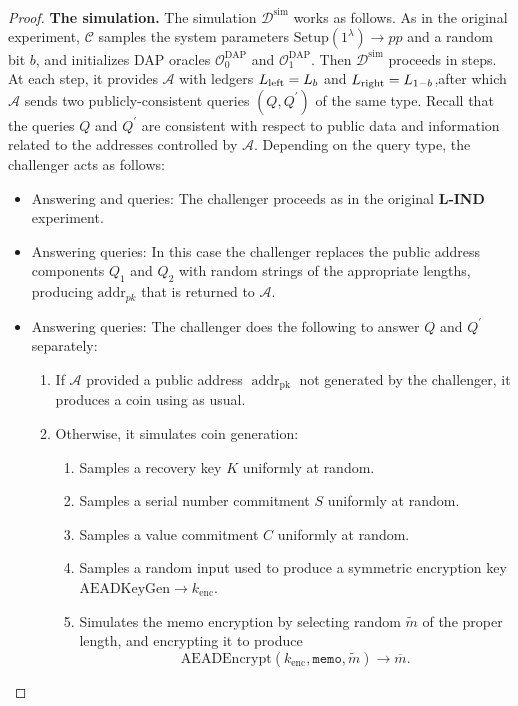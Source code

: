 \documentclass{llncs}
\newcommand{\addr}{\operatorname{addr}}
\begin{document}
\begin{proof}
\textbf{The simulation.} The simulation $\mathcal{D}^{\text{sim}}$ works as follows.
As in the original experiment, $\mathcal{C}$ samples the system parameters $\text{Setup}(1^\lambda) \to pp$ and a random bit $b$, and initializes DAP oracles $\mathcal{O}^{\text{DAP}}_0$ and $\mathcal{O}^{\text{DAP}}_1$.
Then $\mathcal{D}^{\text{sim}}$ proceeds in steps.
At each step, it provides $\mathcal{A}$ with ledgers $L_{\text{\text{left}}} = L_{b}$ and $L_{\text{\text{right}}} = L_{1-b}$,after which $\mathcal{A}$ sends two publicly-consistent queries $(Q, Q^\prime)$ of the same type.
Recall that the queries $Q$ and $Q^\prime$ are consistent with respect to public data and information related to the addresses controlled by $\mathcal{A}$.
Depending on the query type, the challenger acts as follows:
\begin{itemize}
    \item Answering  and  queries: The challenger proceeds as in the original \textbf{L-IND} experiment.
    \item Answering  queries: In this case the challenger replaces the public address components $Q_1$ and $Q_2$ with random strings of the appropriate lengths, producing $\text{addr}_{pk}$ that is returned to $\mathcal{A}$.
    \item Answering  queries: The challenger does the following to answer $Q$ and $Q^\prime$ separately:
    \begin{enumerate}
        \item If $\mathcal{A}$ provided a public address $\addr_{\text{pk}}$ not generated by the challenger, it produces a coin using  as usual.
        \item Otherwise, it simulates coin generation:
        \begin{enumerate}
            \item Samples a recovery key $K$ uniformly at random.
            \item Samples a serial number commitment $S$ uniformly at random.
            \item Samples a value commitment $C$ uniformly at random.
            \item Samples a random input used to produce a symmetric encryption key $\text{AEADKeyGen} \to k_{\text{enc}}$.
            \item Simulates the memo encryption by selecting random $\widetilde{m}$ of the proper length, and encrypting it to produce $$\text{AEADEncrypt}(k_{\text{enc}},\texttt{memo},\widetilde{m}) \to \overline{m}.$$

\end{enumerate}
\end{enumerate}
\end{itemize}
\end{proof}
\end{document}
